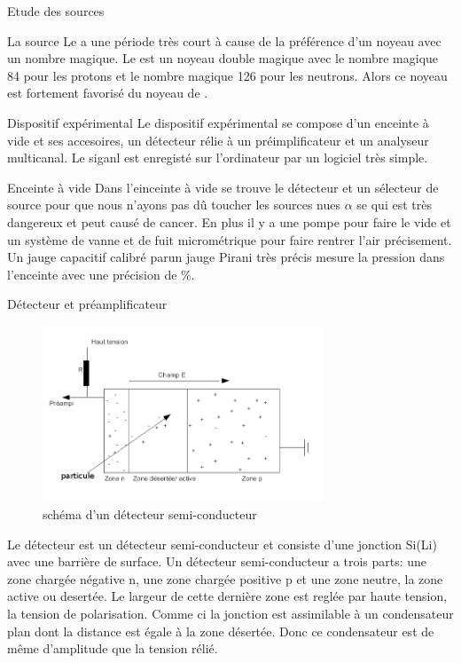 \documentclass[a4paper,11pt]{scrartcl}
\begin{document}
\begin{section}{Etude des sources}
\begin{subsection}{La source }
   Le  a une période très court à cause de la préférence d'un noyeau avec un nombre magique. Le  est un noyeau double magique avec le nombre magique 84 pour les protons et le nombre magique 126 pour les neutrons. Alors ce noyeau est fortement favorisé du noyeau de .
  \end{subsection}
 \end{section}

 \begin{section}{Dispositif expérimental}
   Le dispositif expérimental se compose d'un enceinte à vide et ses accesoires, un détecteur rélie à un préimplificateur et un analyseur multicanal. Le siganl est enregisté sur l'ordinateur par un logiciel très simple.
   
   \begin{subsection}{Enceinte à vide}
    Dans l'einceinte à vide se trouve le détecteur et un sélecteur de source pour que nous n'ayons pas dû toucher les sources nues $\alpha$ se qui est très dangereux et peut causé de cancer. En plus il y a une pompe pour faire le vide et un système de vanne et de fuit micrométrique pour faire rentrer l'air précisement. Un jauge capacitif calibré parun jauge Pirani très précis mesure la pression dans l'enceinte avec une précision de \unit[0,2]{\%}.  
   \end{subsection}

   \begin{subsection}{Détecteur et préamplificateur}
    \begin{figure}[hbt]
     \begin{center}
      \includegraphics[width=0.75\textwidth]{Bilder/detecteur.png}
     \end{center}
     \caption{schéma d'un détecteur semi-conducteur}
    \end{figure}
    Le détecteur est un détecteur semi-conducteur et consiste d'une jonction Si(Li) avec une barrière de surface. Un détecteur semi-conducteur a trois parts: une zone chargée négative n, une zone chargée positive p  et une zone neutre, la zone active ou desertée. Le largeur de cette dernière zone est reglée par haute tension, la tension de polarisation. Comme ci la jonction est assimilable à un condensateur plan dont la distance est égale à la zone désertée. Donc ce condensateur est de même d'amplitude que la tension rélié.


\end{subsection}
\end{section}
\end{document}
